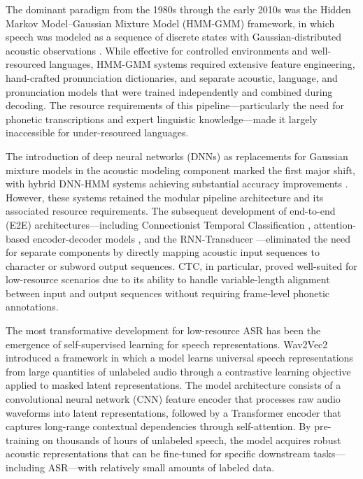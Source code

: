 \documentclass[12pt,a4paper]{article}
\begin{document}
The dominant paradigm from the 1980s through the early 2010s was the Hidden Markov Model--Gaussian Mixture Model (HMM-GMM) framework, in which speech was modeled as a sequence of discrete states with Gaussian-distributed acoustic observations \citep{rabiner1989tutorial}. While effective for controlled environments and well-resourced languages, HMM-GMM systems required extensive feature engineering, hand-crafted pronunciation dictionaries, and separate acoustic, language, and pronunciation models that were trained independently and combined during decoding. The resource requirements of this pipeline---particularly the need for phonetic transcriptions and expert linguistic knowledge---made it largely inaccessible for under-resourced languages.

The introduction of deep neural networks (DNNs) as replacements for Gaussian mixture models in the acoustic modeling component marked the first major shift, with hybrid DNN-HMM systems achieving substantial accuracy improvements \citep{hinton2012deep}. However, these systems retained the modular pipeline architecture and its associated resource requirements. The subsequent development of end-to-end (E2E) architectures---including Connectionist Temporal Classification \citep{graves2006connectionist}, attention-based encoder-decoder models \citep{chan2016listen}, and the RNN-Transducer \citep{graves2012sequence}---eliminated the need for separate components by directly mapping acoustic input sequences to character or subword output sequences. CTC, in particular, proved well-suited for low-resource scenarios due to its ability to handle variable-length alignment between input and output sequences without requiring frame-level phonetic annotations.

The most transformative development for low-resource ASR has been the emergence of self-supervised learning for speech representations. Wav2Vec2 \citep{baevski2020wav2vec} introduced a framework in which a model learns universal speech representations from large quantities of unlabeled audio through a contrastive learning objective applied to masked latent representations. The model architecture consists of a convolutional neural network (CNN) feature encoder that processes raw audio waveforms into latent representations, followed by a Transformer encoder that captures long-range contextual dependencies through self-attention. By pre-training on thousands of hours of unlabeled speech, the model acquires robust acoustic representations that can be fine-tuned for specific downstream tasks---including ASR---with relatively small amounts of labeled data.
\end{document}
